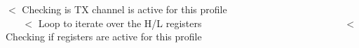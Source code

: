 $<$ Checking is TX channel is active for this profile ~\newline
~\newline
~\newline
~\newline
~\newline
~\newline
~\newline
~\newline
~\newline
~\newline
~\newline
~\newline
~\newline
~\newline
~\newline
~\newline
~\newline
~\newline
 $<$ Loop to iterate over the H/L registers ~\newline
~\newline
~\newline
~\newline
~\newline
~\newline
~\newline
~\newline
~\newline
~\newline
~\newline
~\newline
~\newline
~\newline
~\newline
~\newline
~\newline
 $<$ Checking if registers are active for this profile

